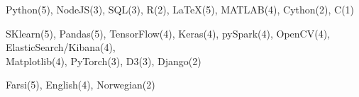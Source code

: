 
  \begin{cvitems}
    \vspace{.5\baselineskip}

   \item \small{Python(5), NodeJS(3), SQL(3), R(2), \LaTeX(5), MATLAB(4), Cython(2), C(1)}
   \item \small{SKlearn(5), Pandas(5), TensorFlow(4), Keras(4), pySpark(4), OpenCV(4), ElasticSearch/Kibana(4),\\Matplotlib(4), PyTorch(3), D3(3), Django(2)}
   \item \small{Farsi(5), English(4), Norwegian(2)}

  \end{cvitems}
